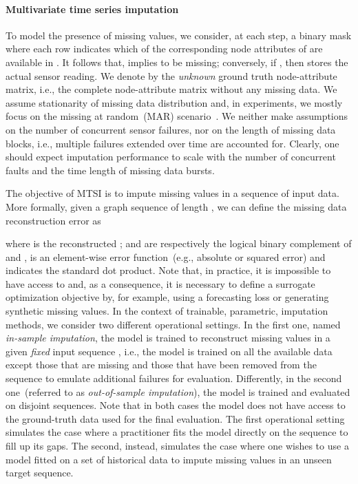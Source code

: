 \documentclass{article} \usepackage{iclr2022_conference,times}
\begin{document}
\paragraph{Multivariate time series imputation} To model the presence of missing values, we consider, at each step, a binary mask  where each row  indicates which of the corresponding node attributes of  are available in . It follows that,  implies  to be missing; conversely, if , then  stores the actual sensor reading. We denote by  the \emph{unknown} ground truth node-attribute matrix, i.e., the complete node-attribute matrix without any missing data. We assume stationarity of missing data distribution and, in experiments, we mostly focus on the missing at random~(MAR) scenario~\citep{rubin1976inference}. We neither make assumptions on the number of concurrent sensor failures, nor on the length of missing data blocks, i.e., multiple failures extended over time are accounted for. Clearly, one should expect imputation performance to scale with the number of concurrent faults and the time length of missing data bursts. 

The objective of MTSI is to impute missing values in a sequence of input data. More formally, given a graph sequence  of length , we can define the missing data reconstruction error as

where  is the reconstructed ;  and  are respectively the logical binary complement of  and ,  is an element-wise error function~(e.g., absolute or squared error) and  indicates the standard dot product. Note that, in practice, it is impossible to have access to  and, as a consequence, it is necessary to define a surrogate optimization objective by, for example, using a forecasting loss or generating synthetic missing values. In the context of trainable, parametric, imputation methods, we consider two different operational settings. In the first one, named \emph{in-sample imputation}, the model is trained to reconstruct missing values in a given \emph{fixed} input sequence , i.e., the model is trained on all the available data except those that are missing and those that have been removed from the sequence to emulate additional failures for evaluation. Differently, in the second one~(referred to as \emph{out-of-sample imputation}), the model is trained and evaluated on disjoint sequences. Note that in both cases the model does not have access to the ground-truth data used for the final evaluation. The first operational setting simulates the case where a practitioner fits the model directly on the sequence to fill up its gaps. The second, instead, simulates the case where one wishes to use a model fitted on a set of historical data to impute missing values in an unseen target sequence. 
\end{document}
